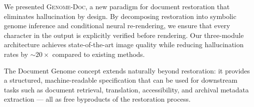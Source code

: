 \documentclass[conference]{IEEEtran}
\newcommand{\ours}{\textsc{Genome-Doc}}
\begin{document}
We presented \ours{}, a new paradigm for document restoration that eliminates
hallucination by design.  By decomposing restoration into symbolic genome inference
and conditional neural re-rendering, we ensure that every character in the output is
explicitly verified before rendering.  Our three-module architecture achieves
state-of-the-art image quality while reducing hallucination rates by ${\sim}20\times$
compared to existing methods.

The Document Genome concept extends naturally beyond restoration: it provides a
structured, machine-readable specification that can be used for downstream tasks
such as document retrieval, translation, accessibility, and archival metadata
extraction --- all as free byproducts of the restoration process.

\end{document}
